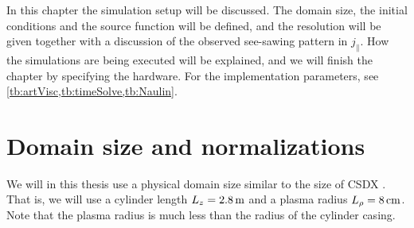 In this chapter the simulation setup will be discussed.
The domain size, the initial conditions and the source function will be defined, and the resolution will be given together with a discussion of the observed see-sawing pattern in $j_\|$.
How the simulations are being executed will be explained, and we will finish the chapter by specifying the hardware.
For the implementation parameters, see \cref{tb:artVisc,tb:timeSolve,tb:Naulin}.

\section{Domain size and normalizations}
%
We will in this thesis use a physical domain size similar to the size of CSDX \cite{Tynan2004a}.
That is, we will use a cylinder length $L_z=2.8\, \text{m}$ and a plasma radius $L_\rho=8\, \text{cm}$.
Note that the plasma radius is much less than the radius of the cylinder casing.
%

